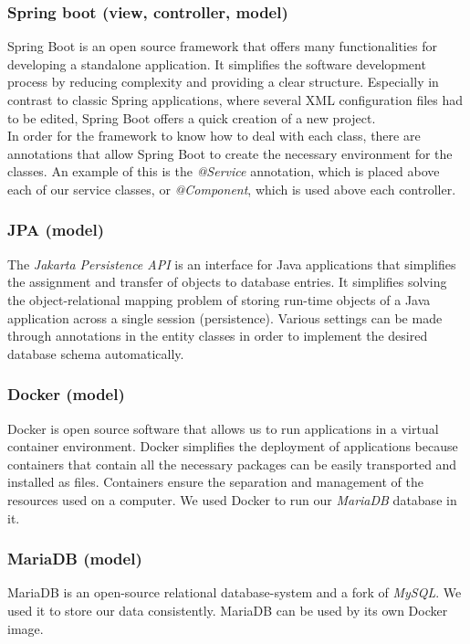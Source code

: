 \subsubsection{Spring boot (view, controller, model)}
Spring Boot is an open source framework that offers many functionalities for developing a standalone application. It simplifies the software development process by reducing complexity and providing a clear structure. Especially in contrast to classic Spring applications, where several XML configuration files had to be edited, Spring Boot offers a quick creation of a new project. \\
In order for the framework to know how to deal with each class, there are annotations that allow Spring Boot to create the necessary environment for the classes. An example of this is the \textit{@Service} annotation, which is placed above each of our service classes, or \textit{@Component}, which is used above each controller.

\subsubsection{JPA (model)}
The \textit{Jakarta Persistence API} is an interface for Java applications that simplifies the assignment and transfer of objects to database entries. It simplifies solving the object-relational mapping problem of storing run-time objects of a Java application across a single session (persistence). Various settings can be made through annotations in the entity classes in order to implement the desired database schema automatically.

\subsubsection{Docker (model)}
Docker is open source software that allows us to run applications in a virtual container environment. Docker simplifies the deployment of applications because containers that contain all the necessary packages can be easily transported and installed as files. Containers ensure the separation and management of the resources used on a computer. We used Docker to run our \textit{MariaDB} database in it.

\subsubsection{MariaDB (model)}
MariaDB is an open-source relational database-system and a fork of \textit{MySQL}. We used it to store our data consistently. MariaDB can be used by its own Docker image.

